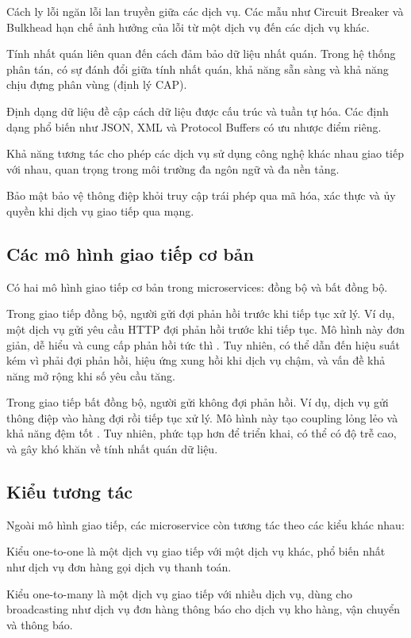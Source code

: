 Cách ly lỗi ngăn lỗi lan truyền giữa các dịch vụ. Các mẫu như Circuit Breaker và Bulkhead hạn chế ảnh hưởng của lỗi từ một dịch vụ đến các dịch vụ khác.

Tính nhất quán liên quan đến cách đảm bảo dữ liệu nhất quán. Trong hệ thống phân tán, có sự đánh đổi giữa tính nhất quán, khả năng sẵn sàng và khả năng chịu đựng phân vùng (định lý CAP).

Định dạng dữ liệu đề cập cách dữ liệu được cấu trúc và tuần tự hóa. Các định dạng phổ biến như JSON, XML và Protocol Buffers có ưu nhược điểm riêng.

Khả năng tương tác cho phép các dịch vụ sử dụng công nghệ khác nhau giao tiếp với nhau, quan trọng trong môi trường đa ngôn ngữ và đa nền tảng.

Bảo mật bảo vệ thông điệp khỏi truy cập trái phép qua mã hóa, xác thực và ủy quyền khi dịch vụ giao tiếp qua mạng.

\subsection{Các mô hình giao tiếp cơ bản}
Có hai mô hình giao tiếp cơ bản trong microservices: đồng bộ và bất đồng bộ.

Trong giao tiếp đồng bộ, người gửi đợi phản hồi trước khi tiếp tục xử lý. Ví dụ, một dịch vụ gửi yêu cầu HTTP đợi phản hồi trước khi tiếp tục. Mô hình này đơn giản, dễ hiểu và cung cấp phản hồi tức thì \cite{newman2015}. Tuy nhiên, có thể dẫn đến hiệu suất kém vì phải đợi phản hồi, hiệu ứng xung hồi khi dịch vụ chậm, và vấn đề khả năng mở rộng khi số yêu cầu tăng.

Trong giao tiếp bất đồng bộ, người gửi không đợi phản hồi. Ví dụ, dịch vụ gửi thông điệp vào hàng đợi rồi tiếp tục xử lý. Mô hình này tạo coupling lỏng lẻo và khả năng đệm tốt \cite{hohpe2004}. Tuy nhiên, phức tạp hơn để triển khai, có thể có độ trễ cao, và gây khó khăn về tính nhất quán dữ liệu.

\subsection{Kiểu tương tác}
Ngoài mô hình giao tiếp, các microservice còn tương tác theo các kiểu khác nhau:

Kiểu one-to-one là một dịch vụ giao tiếp với một dịch vụ khác, phổ biến nhất như dịch vụ đơn hàng gọi dịch vụ thanh toán.

Kiểu one-to-many là một dịch vụ giao tiếp với nhiều dịch vụ, dùng cho broadcasting như dịch vụ đơn hàng thông báo cho dịch vụ kho hàng, vận chuyển và thông báo.

